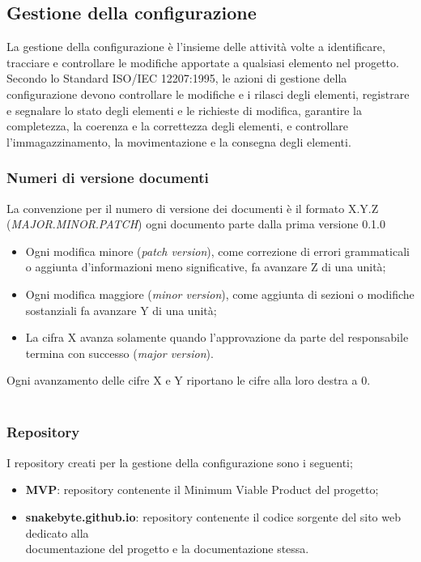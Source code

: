\documentclass[10pt, letterpaper]{article}
\begin{document}
\subsection{Gestione della configurazione}
La gestione della configurazione è l'insieme delle attività volte a identificare, tracciare e controllare le modifiche apportate a qualsiasi elemento nel progetto.
Secondo lo Standard ISO/IEC 12207:1995, le azioni di gestione della configurazione devono controllare le modifiche e i rilasci degli elementi, registrare e segnalare lo stato degli elementi e
le richieste di modifica, garantire la completezza, la coerenza e la correttezza degli elementi, e controllare
l'immagazzinamento, la movimentazione e la consegna degli elementi.

\label{sec:Versionamento}
\subsubsection{Numeri di versione documenti}
La convenzione per il numero di versione dei documenti è il formato X.Y.Z (\textit{MAJOR}.\textit{MINOR}.\textit{PATCH}) ogni documento parte dalla prima versione 0.1.0
\begin{itemize}
    \item Ogni modifica minore (\textit{patch version}), come correzione di errori grammaticali o aggiunta d'informazioni meno significative, fa avanzare Z di una unità;
    \item Ogni modifica maggiore (\textit{minor version}), come aggiunta di sezioni o modifiche sostanziali fa avanzare Y di una unità;
    \item La cifra X avanza solamente quando l'approvazione da parte del responsabile termina con successo (\textit{major version}).
\end{itemize}
Ogni avanzamento delle cifre X e Y riportano le cifre alla loro destra a 0.\\ \\
\subsubsection{Repository}
I repository creati per la gestione della configurazione sono i seguenti;
\begin{itemize}
    \item \textbf{MVP}: repository contenente il Minimum Viable Product del progetto;
    \item \textbf{snakebyte.github.io}: repository contenente il codice sorgente del sito web dedicato alla\\ documentazione del progetto e la documentazione stessa.
\end{itemize}
\end{document}
